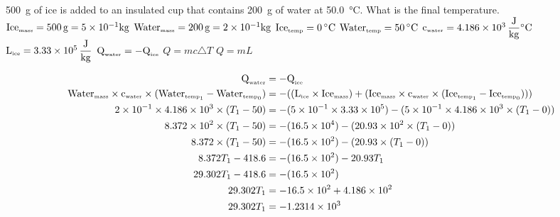 \documentclass{article}
\begin{document}
\begin{outline}[enumerate]
\newpage






\1 \SI{500}{\gram} of ice is added to an insulated cup that contains \SI{200}{g} of water at \SI{50.0}{\celsius}. What is the final temperature.
	\2 $\mbox{Ice}_{\tiny{\mbox{mass}}} = \SI{500}{\gram} = 5 \times 10^{-1} \SI{}{\kilogram}$
	\2 $\mbox{Water}_{\tiny{\mbox{mass}}} = \SI{200}{\gram} = 2 \times 10^{-1} \SI{}{\kilogram}$
	\2 $\mbox{Ice}_{\tiny{\mbox{temp}}} = \SI{0}{\celsius}$
	\2 $\mbox{Water}_{\tiny{\mbox{temp}}} = \SI{50}{\celsius}$
	\2 $\mbox{c}_{\tiny{\mbox{water}}} = 4.186 \times 10^3  \, \dfrac{\SI{}{\joule}}{\SI{}{\kilogram}}\SI{}{\celsius}$
	\2 $\mbox{L}_{\tiny{\mbox{ice}}} = 3.33 \times 10^5  \, \dfrac{\SI{}{\joule}}{\SI{}{\kilogram}}$
	\2 $\mbox{Q}_{\tiny{\mbox{water}}} = -\mbox{Q}_{\tiny{\mbox{ice}}}$
	\2 $Q = mc \triangle T$
	\2 $Q = mL $
	
	
\begin{alignat*}{2}
\mbox{Q}_{\tiny{\mbox{water}}} &= -\mbox{Q}_{\tiny{\mbox{ice}}} \\
\mbox{Water}_{\tiny{\mbox{mass}}} \times \mbox{c}_{\tiny{\mbox{water}}} \times (\mbox{Water}_{\mbox{\tiny{temp}}_1} - \mbox{Water}_{\mbox{\tiny{temp}}_0})
&= 
-((\mbox{L}_{\tiny{\mbox{ice}}} \times \mbox{Ice}_{\tiny{\mbox{mass}}}) + 
(\mbox{Ice}_{\tiny{\mbox{mass}}} \times \mbox{c}_{\tiny{\mbox{water}}} \times (\mbox{Ice}_{\mbox{\tiny{temp}}_1} - \mbox{Ice}_{\mbox{\tiny{temp}}_0}))) \\
2 \times 10^{-1} \times 4.186 \times 10^3 \times (T_1 - 50) 
&=
-(5 \times 10^{-1} \times 3.33 \times 10^5) -
(5 \times 10^{-1} \times 4.186 \times 10^3 \times (T_1 - 0)) \\
8.372 \times 10^2 \times (T_1 - 50)
&=
-(16.5 \times 10^4) -
(20.93 \times 10^2 \times (T_1 - 0)) \\
8.372 \times (T_1 - 50)
&=
-(16.5 \times 10^2) -
(20.93 \times (T_1 - 0)) \\
8.372T_1 - 418.6
&=
-(16.5 \times 10^2) -
20.93T_1 \\ 
29.302T_1 - 418.6 
&= -(16.5 \times 10^2)\\
29.302T_1 &= -16.5 \times 10^2 + 4.186 \times 10^2 \\
29.302T_1 &= -1.2314 \times 10^3
\end{alignat*}	
	
	
\end{outline}


		
	
	
\end{document}
